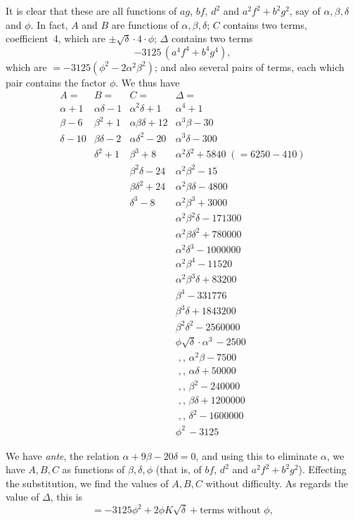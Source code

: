 \documentclass[11pt]{article}
\begin{document}
\newpage
\noindent
It is clear that these are all functions of $ag$, $bf$, $d^{2}$ and
$a^{2}f^{2}+b^{2}g^{2}$, say of $\alpha,\beta,\delta$ and $\phi$.
In fact, $A$ and $B$ are functions of $\alpha,\beta,\delta$; $C$
contains two terms, coefficient~4, which are $\pm\sqrt{\delta}\cdot
4\cdot\phi$; $\Delta$ contains two terms
\[
  -3125\,(a^{4}f^{4}+b^{4}g^{4}),
\]
which are $=-3125(\phi^{2}-2\alpha^{2}\beta^{2})$; and also several
pairs of terms, each which pair contains the factor $\phi$.  We
thus have
\[
\begin{array}{llll}
A= & B= & C= & \Delta=\\[2pt]
\alpha+1 & \alpha\delta-1 & \alpha^{2}\delta+1 & \alpha^{4}+1\\
\beta-6 & \beta^{2}+1 & \alpha\beta\delta+12 & \alpha^{3}\beta-30\\
\delta-10 & \beta\delta-2 & \alpha\delta^{2}-20 & \alpha^{3}\delta-300\\
 & \delta^{2}+1 & \beta^{3}+8 & \alpha^{2}\delta^{2}+5840\;(=6250-410)\\
 & & \beta^{2}\delta-24 & \alpha^{2}\beta^{2}-15\\
 & & \beta\delta^{2}+24 & \alpha^{2}\beta\delta-4800\\
 & & \delta^{3}-8 & \alpha^{2}\beta^{3}+3000\\
 & & & \alpha^{2}\beta^{2}\delta-171300\\
 & & & \alpha^{2}\beta\delta^{2}+780000\\
 & & & \alpha^{2}\delta^{3}-1000000\\
 & & & \alpha^{2}\beta^{4}-11520\\
 & & & \alpha^{2}\beta^{3}\delta+83200\\
 & & & \beta^{4}-331776\\
 & & & \beta^{3}\delta+1843200\\
 & & & \beta^{2}\delta^{2}-2560000\\
 & & & \phi\sqrt{\delta}\cdot\alpha^{3}\,-2500\\
 & & & \;,,\,\alpha^{2}\beta-7500\\
 & & & \;,,\,\alpha\delta+50000\\
 & & & \;,,\,\beta^{2}-240000\\
 & & & \;,,\,\beta\delta+1200000\\
 & & & \;,,\,\delta^{2}-1600000\\
 & & & \phi^{2}\,-3125
\end{array}
\]

\medskip
\noindent
We have \textit{ante}, the relation $\alpha+9\beta-20\delta=0$, and
using this to eliminate $\alpha$, we have $A,B,C$ as functions of
$\beta,\delta,\phi$ (that is, of $bf$, $d^{2}$ and
$a^{2}f^{2}+b^{2}g^{2}$).  Effecting the substitution, we find the
values of $A,B,C$ without difficulty.  As regards the value of
$\Delta$, this is
\[
  =-3125\phi^{2}+2\phi K\sqrt{\delta}+\text{terms without }\phi,
\]
\end{document}
